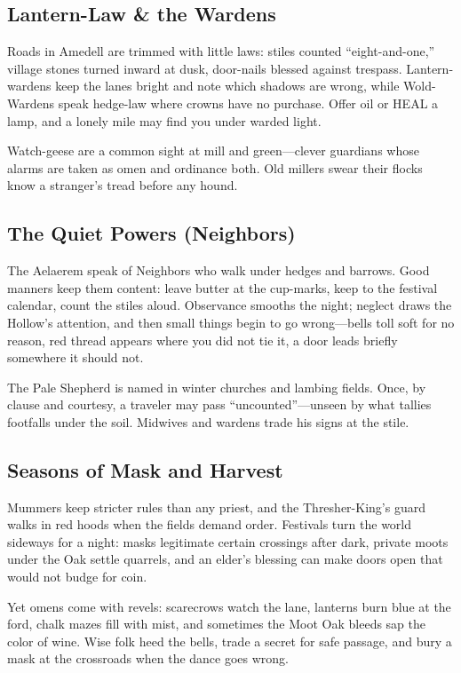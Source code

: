 \documentclass[11pt,letterpaper]{article}
\begin{document}
\subsection*{Lantern-Law \& the Wardens}

Roads in Amedell are trimmed with little laws: stiles counted ``eight-and-one,'' village stones turned inward at dusk, door-nails blessed against trespass. Lantern-wardens keep the lanes bright and note which shadows are wrong, while Wold-Wardens speak hedge-law where crowns have no purchase. Offer oil or HEAL a lamp, and a lonely mile may find you under warded light.

Watch-geese are a common sight at mill and green---clever guardians whose alarms are taken as omen and ordinance both. Old millers swear their flocks know a stranger's tread before any hound.

\subsection*{The Quiet Powers (Neighbors)}

The Aelaerem speak of Neighbors who walk under hedges and barrows. Good manners keep them content: leave butter at the cup-marks, keep to the festival calendar, count the stiles aloud. Observance smooths the night; neglect draws the Hollow's attention, and then small things begin to go wrong---bells toll soft for no reason, red thread appears where you did not tie it, a door leads briefly somewhere it should not.

The Pale Shepherd is named in winter churches and lambing fields. Once, by clause and courtesy, a traveler may pass ``uncounted''---unseen by what tallies footfalls under the soil. Midwives and wardens trade his signs at the stile.

\subsection*{Seasons of Mask and Harvest}

Mummers keep stricter rules than any priest, and the Thresher-King's guard walks in red hoods when the fields demand order. Festivals turn the world sideways for a night: masks legitimate certain crossings after dark, private moots under the Oak settle quarrels, and an elder's blessing can make doors open that would not budge for coin.

Yet omens come with revels: scarecrows watch the lane, lanterns burn blue at the ford, chalk mazes fill with mist, and sometimes the Moot Oak bleeds sap the color of wine. Wise folk heed the bells, trade a secret for safe passage, and bury a mask at the crossroads when the dance goes wrong.
\end{document}
